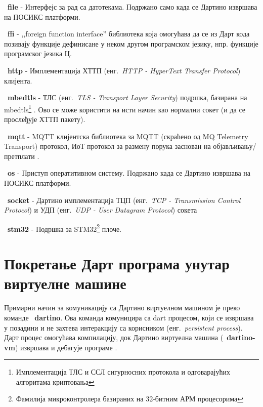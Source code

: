 \documentclass[12pt,oneside]{memoir}
\begin{document}
\begin{description}

\item ~\textbf{file} - Интерфејс за рад са датотекама. Подржано само када се Дартино извршава на ПОСИКС платформи.

\item ~\textbf{ffi} - ,,foreign function interface'' библиотека која омогућава да се из Дарт кода позивају функције дефинисане у неком другом програмском језику, нпр. функције програмског језика Ц.

\item ~\textbf{http} - Имплементација ХТТП (енг.~\textit{HTTP - HyperText Transfer Protocol}) клијента.

\item ~\textbf{mbedtls} - ТЛС (енг.~\textit{TLS - Transport Layer Security}) подршка, базирана на mbedtls\footnote{ Имплементација ТЛС и ССЛ сигурносних протокола и одговарајућих алгоритама криптовања} \cite{mbed}.
Ово се може користити на исти начин као нормални сокет (и да се прослеђује ХТТП пакету).

\item ~\textbf{mqtt} - MQTT клијентска библиотека за MQTT (скраћено од MQ Telemetry Transport) протокол, ИоТ протокол за размену порука заснован на објављивању/претплати \cite{mqtt}.

\item ~\textbf{os} - Приступ оператитивном систему. Подржано када се Дартино извршава на ПОСИКС платформи.

\item ~\textbf{socket} - Дартино имплементација ТЦП (енг.~\textit{TCP - Transmission Control Protocol}) и УДП (енг.~\textit{UDP - User Datagram Protocol}) сокета

\item ~\textbf{stm32} - Подршка за STM32\footnote{Фамилија микроконтролера базираних на 32-битним АРМ процесорима} плоче.

\end{description}

\section{Покретање Дарт програма унутар виртуелне машине}
\label{sec:pokretanje}

Примарни начин за комуникацију са Дартино виртуелном машином је преко команде ~\textbf{dartino}. Ова команда комуницира са dart процесом, који се извршава у позадини и не захтева интеракцију са корисником (енг.~\textit{persistent process}). Дарт процес омогућава компилацију, док Дартино виртуелна машина (~\textbf{dartino-vm}) извршава и дебагује програме .\\
\end{document}
